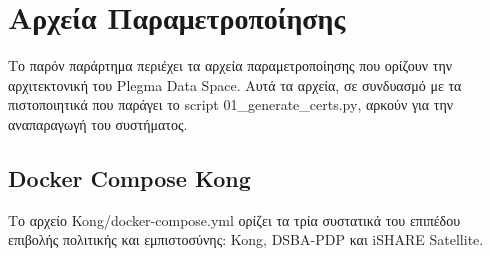 \chapter{Αρχεία Παραμετροποίησης}
\label{app:config-files}

Το παρόν παράρτημα περιέχει τα αρχεία παραμετροποίησης που ορίζουν
την αρχιτεκτονική του \textlatin{Plegma Data Space}. Αυτά τα αρχεία,
σε συνδυασμό με τα πιστοποιητικά που παράγει το \textlatin{script}
\textlatin{ 01\_generate\_certs.py}, αρκούν για την αναπαραγωγή του
συστήματος.

\section{\textlatin{Docker Compose Kong}}
\label{app:docker-kong}

Το αρχείο \textlatin{Kong/docker-compose.yml} ορίζει τα τρία συστατικά
του επιπέδου επιβολής πολιτικής και εμπιστοσύνης: \textlatin{Kong},
\textlatin{DSBA-PDP} και \textlatin{iSHARE Satellite}.

